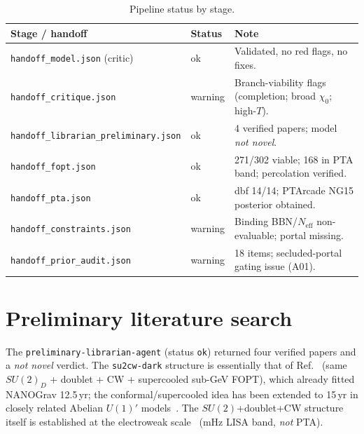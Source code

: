 \documentclass[11pt]{article}
\newcommand{\Neff}{N_{\mathrm{eff}}}
\newcommand{\chizero}{\chi_0}
\begin{document}
\begin{table}[h]
\centering
\small
\begin{tabular}{@{}llp{8.4cm}@{}}
\toprule
Stage / handoff & Status & Note \\
\midrule
\texttt{handoff\_model.json} (critic) & ok & Validated, no red flags, no fixes. \\
\texttt{handoff\_critique.json} & warning & Branch-viability flags (completion; broad $\chizero$; high-$T$). \\
\texttt{handoff\_librarian\_preliminary.json} & ok & 4 verified papers; model \emph{not novel}. \\
\texttt{handoff\_fopt.json} & ok & 271/302 viable; 168 in PTA band; percolation verified. \\
\texttt{handoff\_pta.json} & ok & dbf 14/14; PTArcade NG15 posterior obtained. \\
\texttt{handoff\_constraints.json} & warning & Binding BBN/$\Neff$ non-evaluable; portal missing. \\
\texttt{handoff\_prior\_audit.json} & warning & 18 items; secluded-portal gating issue (A01). \\
\bottomrule
\end{tabular}
\caption{Pipeline status by stage.}
\label{tab:status}
\end{table}

\section{Preliminary literature search}
\label{sec:lit}
The \texttt{preliminary-librarian-agent} (status \texttt{ok}) returned four verified papers and a
\emph{not novel} verdict. The \texttt{su2cw-dark} structure is essentially that of
Ref.~\cite{Borah2021} (same $SU(2)_D$ + doublet + CW + supercooled sub-GeV FOPT), which already fitted
NANOGrav 12.5\,yr; the conformal/supercooled idea has been extended to 15\,yr in closely related
Abelian $U(1)'$ models~\cite{Balan2025,Goncalves2025}. The $SU(2)$+doublet+CW structure itself is
established at the electroweak scale~\cite{Mohamadnejad2020} (mHz LISA band, \emph{not} PTA).
\end{document}
